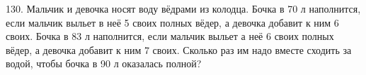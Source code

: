 130. Мальчик и девочка носят воду вёдрами из колодца. Бочка в 70 л наполнится, если мальчик выльет в неё 5 своих полных вёдер, а девочка добавит к ним 6 своих.
Бочка в 83 л наполнится, если мальчик выльет а неё 6 своих полных вёдер, а девочка добавит к ним 7 своих. Сколько раз им надо вместе сходить за водой, чтобы бочка в 90 л оказалась полной?\\
